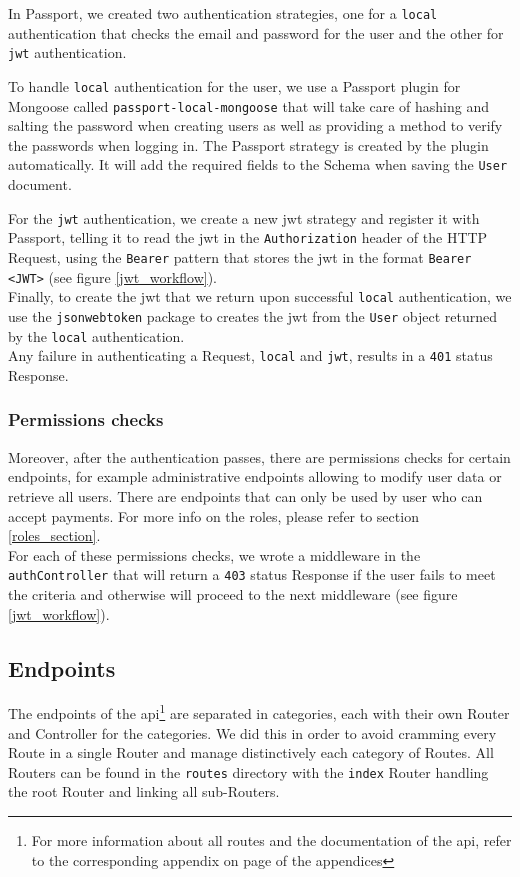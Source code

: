 \documentclass[twoside, openright,11pt,a4paper]{book}
\begin{document}
In Passport, we created two authentication strategies, one for a \verb+local+ authentication that checks the email and password for the user and the other for \texttt{\gls{jwt}} authentication. 

To handle \verb+local+ authentication for the user, we use a Passport plugin for Mongoose called \verb+passport-local-mongoose+\cite{github:passport_local_mongoose} that will take care of hashing and salting the password when creating users as well as providing a method to verify the passwords when logging in. The Passport strategy is created by the plugin automatically. It will add the required fields to the Schema when saving the \verb+User+ document.

For the \texttt{\gls{jwt}} authentication, we create a new \gls{jwt} strategy and register it with Passport, telling it to read the \gls{jwt} in the \verb+Authorization+ header\cite{mdn:doc:auth} of the HTTP Request, using the \verb+Bearer+ pattern that stores the \gls{jwt} in the format \verb+Bearer <JWT>+ (see figure \ref{jwt_workflow}).\\

Finally, to create the \gls{jwt} that we return upon successful \verb+local+ authentication, we use the \verb+jsonwebtoken+ package\cite{github:jsonwebtoken} to creates the \gls{jwt} from the \verb+User+ object returned by the \verb+local+ authentication.\\

Any failure in authenticating a Request, \verb+local+ and \texttt{\gls{jwt}}, results in a \verb+401+\cite{mdn:status:401} status Response.
\subsubsection{Permissions checks}
Moreover, after the authentication passes, there are permissions checks for certain endpoints, for example administrative endpoints allowing to modify user data or retrieve all users. There are endpoints that can only be used by user who can accept payments. For more info on the roles, please refer to section \ref{roles_section}.\\

For each of these permissions checks, we wrote a middleware in the \verb+authController+ that will return a \verb+403+\cite{mdn:status:403} status Response if the user fails to meet the criteria and otherwise will proceed to the next middleware (see figure \ref{jwt_workflow}).
\subsection{Endpoints}
The endpoints of the \gls{api}\footnote{For more information about all routes and the documentation of the \gls{api}, refer to the corresponding appendix on page \pageref{appendix_api_doc} of the appendices} are separated in categories, each with their own Router and Controller for the categories. We did this in order to avoid cramming every Route in a single Router and manage distinctively each category of Routes. All Routers can be found in the \verb+routes+ directory with the \verb+index+ Router handling the root Router and linking all sub-Routers. \\
\end{document}
